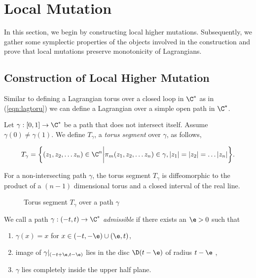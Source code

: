 \section{Local Mutation}\label{sec:setup}

In this section, we begin by constructing local higher mutations. Subsequently, we gather some symplectic properties of the objects involved in the construction and prove that local mutations preserve monotonicity of Lagrangians.


\subsection{Construction of Local Higher Mutation}

Similar to defining a Lagrangian torus over a closed loop in $\C^*$ as in (\ref{eqn:lagtoru}) we can define a Lagrangian over a simple open path in $\C^*$.  

\begin{defn}\label{defn:torusseg}
Let $\gamma : [0, 1] \to \C^*$ be a path that does not intersect itself. Assume $\gamma(0) \neq \gamma(1)$.  We define $T_\gamma$,  a \textit{torus segment} over $\gamma$,  as follows, 

\begin{equation}
\label{eq:lagcyl}
    T_{\gamma} =\bigg \{ (z_1, z_2, \dots z_n) \in \C^n \bigg|  \pi_m  (z_1, z_2, \dots z_n) \in \gamma,   |z_1| = |z_2| = \dots |z_n| \bigg \}.
\end{equation} 
\end{defn}
\noindent 
\noindent For a non-intersecting path $\gamma$,  the torus segment $T_\gamma$ is diffeomorphic to the product of a $(n-1)$ dimensional torus and a closed interval of the real line. 

\begin{figure}[ht]
    \centering
    \caption{Torus segment $T_\gamma$ over a path $\gamma$}
    \label{fig:lagoverpath}
\end{figure}



\begin{defn} We call a path $\gamma : (-t, t) \to \C^*$ \textit{admissible} if there exists an $\e >0 $ such that \begin{enumerate}
    \item  $\gamma (x) = x$ for $x\in (-t, -\e) \cup (\e, t)$,
    \item  image of $\gamma|_{(-t+\e, t-\e)}$ lies in the disc $\D(t-\e)$ of radius $t-\e$ ,
    \item $\gamma$ lies completely inside the upper half plane.
\end{enumerate}
 
\end{defn}


